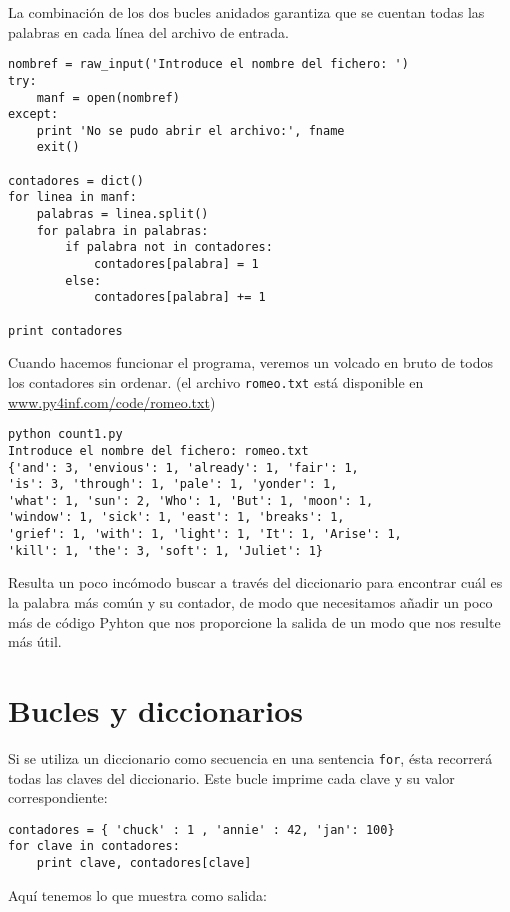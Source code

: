 La combinación de los dos bucles anidados garantiza que se cuentan
todas las palabras en cada línea del archivo de entrada.

\beforeverb
\begin{verbatim}
nombref = raw_input('Introduce el nombre del fichero: ')
try:
    manf = open(nombref)
except:
    print 'No se pudo abrir el archivo:', fname
    exit()

contadores = dict()
for linea in manf:
    palabras = linea.split()
    for palabra in palabras:
        if palabra not in contadores:
            contadores[palabra] = 1
        else:
            contadores[palabra] += 1

print contadores
\end{verbatim}
\afterverb
%
Cuando hacemos funcionar el programa, veremos un volcado en bruto
de todos los contadores sin ordenar.
(el archivo {\tt romeo.txt} está disponible en
\url{www.py4inf.com/code/romeo.txt})

\beforeverb
\begin{verbatim}
python count1.py 
Introduce el nombre del fichero: romeo.txt
{'and': 3, 'envious': 1, 'already': 1, 'fair': 1, 
'is': 3, 'through': 1, 'pale': 1, 'yonder': 1, 
'what': 1, 'sun': 2, 'Who': 1, 'But': 1, 'moon': 1, 
'window': 1, 'sick': 1, 'east': 1, 'breaks': 1, 
'grief': 1, 'with': 1, 'light': 1, 'It': 1, 'Arise': 1, 
'kill': 1, 'the': 3, 'soft': 1, 'Juliet': 1}
\end{verbatim}
\afterverb
%
Resulta un poco incómodo buscar a través del diccionario para encontrar
cuál es la palabra más común y su contador, de modo que necesitamos añadir un poco
más de código Pyhton que nos proporcione la salida de un modo que nos resulte más útil.

\section{Bucles y diccionarios}


Si se utiliza un diccionario como secuencia
en una sentencia {\tt for}, ésta recorrerá todas
las claves del diccionario. Este bucle
imprime cada clave y su valor correspondiente:

\beforeverb
\begin{verbatim}
contadores = { 'chuck' : 1 , 'annie' : 42, 'jan': 100}
for clave in contadores:
    print clave, contadores[clave]
\end{verbatim}
\afterverb
%
Aquí tenemos lo que muestra como salida:

